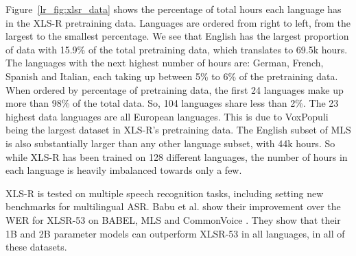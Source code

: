 Figure~\ref{lr_fig:xlsr_data} shows the percentage of total hours each language has in the XLS-R pretraining data. Languages are ordered from right to left, from the largest to the smallest percentage. We see that English has the largest proportion of data with 15.9\% of the total pretraining data, which translates to 69.5k hours. The languages with the next highest number of hours are: German, French, Spanish and Italian, each taking up between 5\% to 6\% of the pretraining data. When ordered by percentage of pretraining data, the first 24 languages make up more than 98\% of the total data. So, 104 languages share less than 2\%. The 23 highest data languages are all European languages. This is due to VoxPopuli \cite{wang-etal-2021-voxpopuli} being the largest dataset in XLS-R's pretraining data. The English subset of MLS \cite{MLS} is also substantially larger than any other language subset, with 44k hours. So while XLS-R has been trained on 128 different languages, the number of hours in each language is heavily imbalanced towards only a few.

XLS-R is tested on multiple speech recognition tasks, including setting new benchmarks for multilingual ASR. Babu et al. \cite{babu2021xlsr} show their improvement over the WER for XLSR-53 on BABEL, MLS and CommonVoice \cite{gales2014speech, MLS, ardila-etal-2020-common}. They show that their 1B and 2B parameter models can outperform XLSR-53 in all languages, in all of these datasets. 

